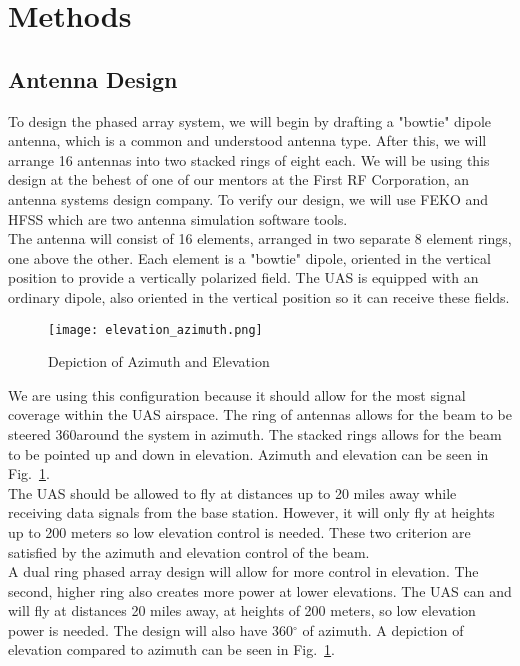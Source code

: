 \documentclass[UROP.tex]{subfiles}
\begin{document}
\bigskip
\section{\Large Methods}
\subsection{Antenna Design}

	To design the phased array system, we will begin by drafting a "bowtie" dipole antenna, which is a common and understood antenna type.  After this, we will arrange 16 antennas into two stacked rings of eight each.  We will be using this design at the behest of one of our mentors at the First RF Corporation, an antenna systems design company.  To verify our design, we will use FEKO and HFSS which are two antenna simulation software tools. \\

	The antenna will consist of 16 elements, arranged in two separate 8 element rings, one above the other.  Each element is a "bowtie" dipole, oriented in the vertical position to provide a vertically polarized field.  The UAS is equipped with an ordinary dipole, also oriented in the vertical position so it can receive these fields.  \\

	
	\begin{figure}[H]
		\centering
		\texttt{[image: elevation\_azimuth.png]}
		\caption{ Depiction of Azimuth and Elevation \label{fig:elevation_azimuth}}
	\end{figure}
	

	We are using this configuration because it should allow for the most signal coverage within the UAS airspace.  The ring of antennas allows for the beam to be steered 360\deg around the system in azimuth.  The stacked rings allows for the beam to be pointed up and down in elevation.  Azimuth and elevation can be seen in Fig.~\ref{fig:elevation_azimuth}.  \\
	
	The UAS should be allowed to fly at distances up to 20 miles away while receiving data signals from the base station.  However, it will only fly at heights up to 200 meters so low elevation control is needed.  These two criterion are satisfied by the azimuth and elevation control of the beam.  \\

	A dual ring phased array design will allow for more control in elevation.  The second, higher ring also creates more power at lower elevations.  The UAS can and will fly at distances 20 miles away, at heights of 200 meters, so low elevation power is needed.  The design will also have 360$^{\circ}$ of azimuth.  A depiction of elevation compared to azimuth can be seen in Fig.~\ref{fig:elevation_azimuth}. \\
	
\end{document}
